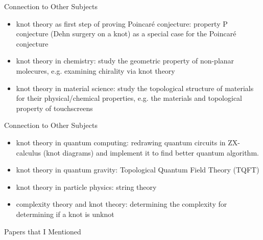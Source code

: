\documentclass[handout, aspectratio=169]{beamer}
\begin{document}
\begin{frame}{Connection to Other Subjects}
    \begin{itemize}
        \item knot theory as first step of proving Poincaré conjecture: property P conjecture (Dehn surgery on a knot) as a special case for the Poincaré conjecture
        \item knot theory in chemistry: study the geometric property of non-planar molecures, e.g. examining chirality via knot theory
        \item knot theory in material science: study the topological structure of materials for their physical/chemical properties, e.g. the materials and topological property of touchscreens
    \end{itemize}
\end{frame} 
\begin{frame}{Connection to Other Subjects}
    \begin{itemize}
        \item knot theory in quantum computing: redrawing quantum circuits in ZX-calculus (knot diagrams) and implement it to find better quantum algorithm.
        \item knot theory in quantum gravity: Topological Quantum Field Theory (TQFT)
        \item knot theory in particle physics: string theory
        \item complexity theory and knot theory: determining the complexity for determining if a knot is unknot
    \end{itemize}
\end{frame}
\begin{frame}[allowframebreaks]{Papers that I Mentioned}
    \tiny
    \nocite{*}
    
    
\end{frame}
\end{document}
